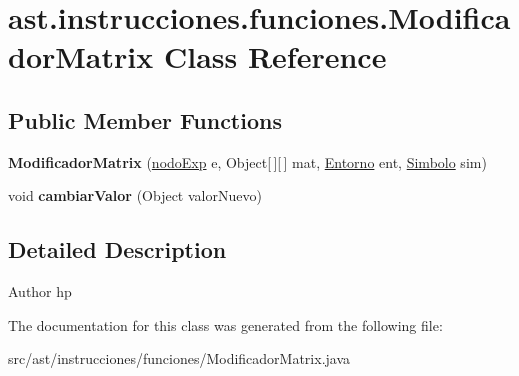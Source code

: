 \hypertarget{classast_1_1instrucciones_1_1funciones_1_1_modificador_matrix}{}\section{ast.\+instrucciones.\+funciones.\+Modificador\+Matrix Class Reference}
\label{classast_1_1instrucciones_1_1funciones_1_1_modificador_matrix}
\subsection*{Public Member Functions}
\begin{DoxyCompactItemize}
\item 
\mbox{\label{classast_1_1instrucciones_1_1funciones_1_1_modificador_matrix_a9254b3058a70f02e868c56ae9afaa2ae}} 
{\bfseries Modificador\+Matrix} (\mbox{\hyperlink{classentorno_1_1nodo_exp}{nodo\+Exp}} e, Object\mbox{[}$\,$\mbox{]}\mbox{[}$\,$\mbox{]} mat, \mbox{\hyperlink{classentorno_1_1_entorno}{Entorno}} ent, \mbox{\hyperlink{classentorno_1_1_simbolo}{Simbolo}} sim)
\item 
\mbox{\label{classast_1_1instrucciones_1_1funciones_1_1_modificador_matrix_ab702e68a1067bedaa1c698c84f4ecbb9}} 
void {\bfseries cambiar\+Valor} (Object valor\+Nuevo)
\end{DoxyCompactItemize}


\subsection{Detailed Description}
\begin{DoxyAuthor}{Author}
hp 
\end{DoxyAuthor}


The documentation for this class was generated from the following file\+:\begin{DoxyCompactItemize}
\item 
src/ast/instrucciones/funciones/Modificador\+Matrix.\+java\end{DoxyCompactItemize}
